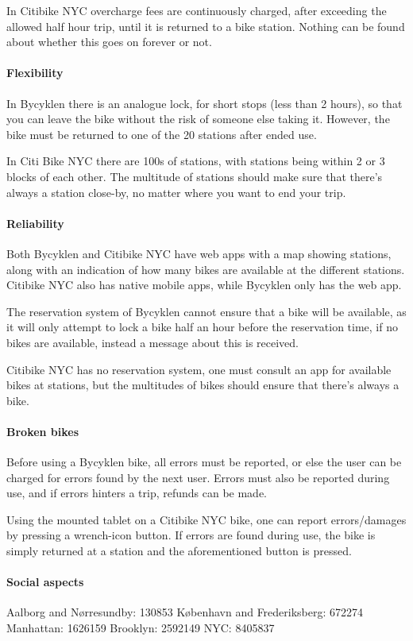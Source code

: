 In Citibike NYC overcharge fees are continuously charged, after exceeding the allowed half hour trip, until it is returned to a bike station.
Nothing can be found about whether this goes on forever or not.

\paragraph{Flexibility}
In Bycyklen there is an analogue lock, for short stops (less than 2 hours), so that you can leave the bike without the risk of someone else taking it.
However, the bike must be returned to one of the 20 stations after ended use.

In Citi Bike NYC there are 100s of stations, with stations being within 2 or 3 blocks of each other.
The multitude of stations should make sure that there's always a station close-by, no matter where you want to end your trip.

\paragraph{Reliability}
Both Bycyklen and Citibike NYC have web apps with a map showing stations, along with an indication of how many bikes are available at the different stations.
Citibike NYC also has native mobile apps, while Bycyklen only has the web app.

The reservation system of Bycyklen cannot ensure that a bike will be available, as it will only attempt to lock a bike half an hour before the reservation time, if no bikes are available, instead a message about this is received.

Citibike NYC has no reservation system, one must consult an app for available bikes at stations, but the multitudes of bikes should ensure that there's always a bike.

\paragraph{Broken bikes}
Before using a Bycyklen bike, all errors must be reported, or else the user can be charged for errors found by the next user.
Errors must also be reported during use, and if errors hinters a trip, refunds can be made.

Using the mounted tablet on a Citibike NYC bike, one can report errors/damages by pressing a wrench-icon button.
If errors are found during use, the bike is simply returned at a station and the aforementioned button is pressed.

\paragraph{Social aspects}
Aalborg and Nørresundby: 130853
København and Frederiksberg: 672274
\cite{bef44}
Manhattan: 1626159
Brooklyn: 2592149
NYC: 8405837
\cite{nyc}
